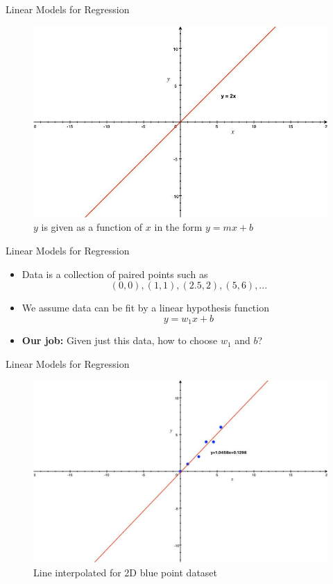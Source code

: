 \begin{frame}{Linear Models for Regression}
    \begin{figure}
    \centering
    \includegraphics[width=.7\textwidth]{img/line.jpg}
    \caption{$y$ is given as a function of $x$ in the form $y=mx+b$}
    \end{figure}
\end{frame}

\begin{frame}{Linear Models for Regression}
\begin{itemize}
    \item Data is a collection of paired points such as
    $$(0, 0), (1, 1), (2.5, 2), (5, 6), ...$$
    \item We assume data can be fit by a linear hypothesis function
    $$y = w_1x + b$$
    \item \textbf{Our job:} Given just this data, how to choose $w_1$ and $b$?
\end{itemize}
\end{frame}

\begin{frame}{Linear Models for Regression}
\begin{figure}
    \centering
    \includegraphics[width=.7\textwidth]{img/regressed_points.jpg}
    \caption{Line interpolated for 2D blue point dataset}
\end{figure}
\end{frame}

